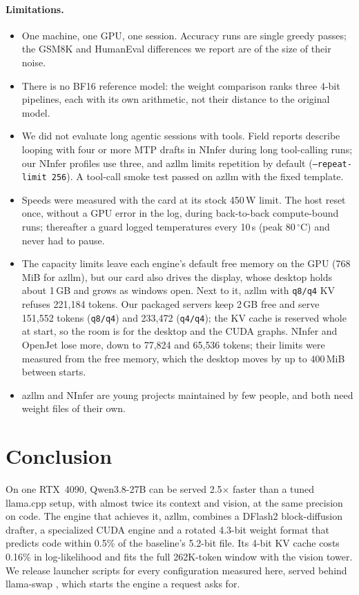 \paragraph{Limitations.}
\begin{itemize}
  \item One machine, one GPU, one session. Accuracy runs are single greedy passes; the GSM8K and
        HumanEval differences we report are of the size of their noise.
  \item There is no BF16 reference model: the weight comparison ranks three 4-bit pipelines,
        each with its own arithmetic, not their distance to the original model.
  \item We did not evaluate long agentic sessions with tools. Field reports describe looping
        with four or more MTP drafts in NInfer during long tool-calling runs;
 our NInfer profiles use three, and azllm limits repetition by
        default (\texttt{--repeat-limit 256}). A tool-call smoke test passed on azllm with the
        fixed template.
  \item Speeds were measured with the card at its stock 450\,W limit. The host reset once,
        without a GPU error in the log, during back-to-back compute-bound runs; thereafter a
        guard logged temperatures every 10\,s (peak 80\,$^\circ$C) and never had to pause.
  \item The capacity limits leave each engine's default free memory on the GPU (768\,MiB for
        azllm), but our card also drives the display, whose desktop holds about 1\,GB and grows
        as windows open. Next to it, azllm with \texttt{q8/q4} KV refuses 221{,}184 tokens. Our
        packaged servers keep 2\,GB free and serve 151{,}552 tokens (\texttt{q8/q4}) and
        233{,}472 (\texttt{q4/q4}); the KV cache is reserved whole at start, so the room is for
        the desktop and the CUDA graphs. NInfer and OpenJet lose more, down to 77{,}824 and
        65{,}536 tokens; their limits were measured from the free memory, which the desktop
        moves by up to 400\,MiB between starts.
  \item azllm and NInfer are young projects maintained by few people, and both need weight
        files of their own.
\end{itemize}

\section{Conclusion}
\label{sec:conclusion}

On one RTX~4090, Qwen3.8-27B can be served 2.5$\times$ faster than a tuned llama.cpp setup,
with almost twice its context and vision, at the same precision on code. The engine that
achieves it, azllm, combines a DFlash2 block-diffusion drafter, a specialized CUDA engine and a
rotated 4.3-bit weight format that predicts code within 0.5\% of the baseline's 5.2-bit file.
Its 4-bit KV cache costs 0.16\% in log-likelihood and fits the full 262K-token window with the
vision tower. We release launcher scripts for every configuration measured here, served
behind llama-swap \citep{llamaswap}, which starts the engine a request asks for.

